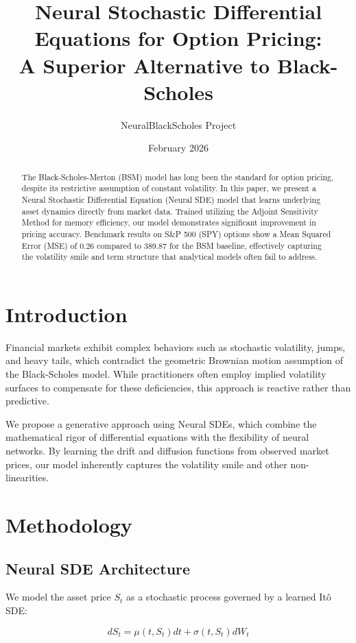 \documentclass{article}
\title{Neural Stochastic Differential Equations for Option Pricing: \\
A Superior Alternative to Black-Scholes}
\author{NeuralBlackScholes Project}
\date{February 2026}
\begin{document}
\maketitle

\begin{abstract}
The Black-Scholes-Merton (BSM) model has long been the standard for option pricing, despite its restrictive assumption of constant volatility. In this paper, we present a Neural Stochastic Differential Equation (Neural SDE) model that learns underlying asset dynamics directly from market data. Trained utilizing the Adjoint Sensitivity Method for memory efficiency, our model demonstrates significant improvement in pricing accuracy. Benchmark results on S\&P 500 (SPY) options show a Mean Squared Error (MSE) of 0.26 compared to 389.87 for the BSM baseline, effectively capturing the volatility smile and term structure that analytical models often fail to address.
\end{abstract}

\section{Introduction}
Financial markets exhibit complex behaviors such as stochastic volatility, jumps, and heavy tails, which contradict the geometric Brownian motion assumption of the Black-Scholes model. While practitioners often employ implied volatility surfaces to compensate for these deficiencies, this approach is reactive rather than predictive. 

We propose a generative approach using Neural SDEs, which combine the mathematical rigor of differential equations with the flexibility of neural networks. By learning the drift and diffusion functions from observed market prices, our model inherently captures the volatility smile and other non-linearities.

\section{Methodology}
\subsection{Neural SDE Architecture}
We model the asset price $S_t$ as a stochastic process governed by a learned Itô SDE:

\begin{equation}
dS_t = \mu(t, S_t) dt + \sigma(t, S_t) dW_t
\end{equation}
\end{document}
